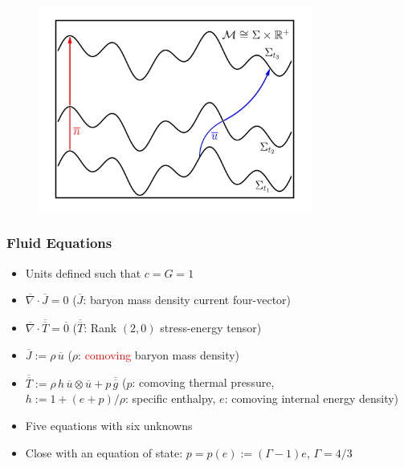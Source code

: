 \documentclass{beamer}
\newcommand{\red}{\textcolor{red}}
\newcommand{\ol}{\overline}
\begin{document}
\begin{frame}

  \begin{figure}[htb!]
    \centering
    \includegraphics[width=0.8\textwidth]{fig.1+1b.png}
  \end{figure}

\end{frame}

\begin{frame}
\frametitle{Fluid Equations}

  \begin{itemize}[<+->]
    \item[]
      Units defined such that $c=G=1$\\[1em]
    \item[]
      $\ol{\nabla}\cdot\ol{J}=0$\hspace{1em}
      ($\ol{J}$: baryon mass density current four-vector)
    \item[]
      $\ol{\nabla}\cdot\ol{\ol{T}}=\ol{0}$\hspace{1em}
      ($\ol{\ol{T}}$: Rank $\left(2,0\right)$ stress-energy tensor)\\[1em]
    \item[]
      $\ol{J}:=\rho\,\ol{u}$\hspace{1em}
      ($\rho$: \red{comoving} baryon mass density)\\[1em]
    \item[]
      $\ol{\ol{T}}:=\rho\,h\,\ol{u}\otimes\ol{u}+p\,\ol{\ol{g}}$\hspace{1em}
      ($p$: comoving thermal pressure,\\[0.5em]
      $h:=1+\left(e+p\right)/\rho$: specific enthalpy,
      $e$: comoving internal energy density)\\[1em]
    \item[]
      Five equations with six unknowns \frownie{}\\[1em]
    \item[]
      Close with an equation of state:
      $p=p\left(e\right):=\left(\Gamma-1\right)e$,
      $\Gamma=4/3$
  \end{itemize}

\end{frame}
\end{document}

